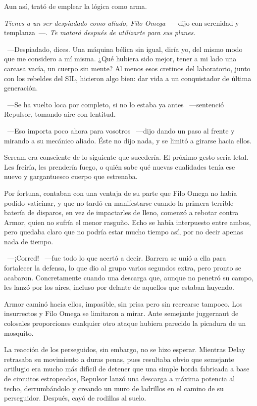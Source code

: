 Aun así, trató de emplear la lógica como arma.

\emph{Tienes a un ser despiadado como aliado, Filo Omega} ~---dijo con serenidad y templanza~---. \emph{Te matará después de utilizarte para sus planes.}

~---Despiadado, dices. Una máquina bélica sin igual, diría yo, del mismo modo que me considero a mí misma. ¿Qué hubiera sido mejor, tener a mi lado una carcasa vacía, un cuerpo sin mente? Al menos esos cretinos del laboratorio, junto con los rebeldes del SIL, hicieron algo bien: dar vida a un conquistador de última generación.

~---Se ha vuelto loca por completo, si no lo estaba ya antes ~---sentenció Repulsor, tomando aire con lentitud.

~---Eso importa poco ahora para vosotros ~---dijo dando un paso al frente y mirando a su mecánico aliado. Éste no dijo nada, y se limitó a girarse hacia ellos.

Scream era consciente de lo siguiente que sucedería. El próximo gesto seria letal. Les freiría, les prendería fuego, o quién sabe qué nuevas cualidades tenía ese nuevo y gargantuesco cuerpo que estrenaba.

Por fortuna, contaban con una ventaja de su parte que Filo Omega no había podido vaticinar, y que no tardó en manifestarse cuando la primera terrible batería de disparos, en vez de impactarles de lleno, comenzó a rebotar contra Armor, quien no sufría el menor rasguño. Echo se había interpuesto entre ambos, pero quedaba claro que no podría estar mucho tiempo así, por no decir apenas nada de tiempo.

~---¡Corred! ~---fue todo lo que acertó a decir. Barrera se unió a ella para fortalecer la defensa, lo que dio al grupo varios segundos extra, pero pronto se acabaron. Concretamente cuando una descarga que, aunque no penetró su campo, les lanzó por los aires, incluso por delante de aquellos que estaban huyendo.

Armor caminó hacia ellos, impasible, sin prisa pero sin recrearse tampoco. Los insurrectos y Filo Omega se limitaron a mirar. Ante semejante juggernaut de colosales proporciones cualquier otro ataque hubiera parecido la picadura de un mosquito.

La reacción de los perseguidos, sin embargo, no se hizo esperar. Mientras Delay retrasaba su movimiento a duras penas, pues resultaba obvio que semejante artilugio era mucho más difícil de detener que una simple horda fabricada a base de circuitos estropeados, Repulsor lanzó una descarga a máxima potencia al techo, derrumbándolo y creando un muro de ladrillos en el camino de su perseguidor. Después, cayó de rodillas al suelo.

